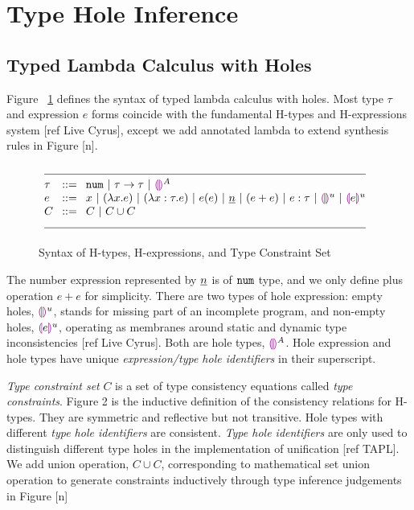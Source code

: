 \section{Type Hole Inference}
\label{sec:typinf}
\subsection{Typed Lambda Calculus with Holes}
\label{sec:syntax}

Figure ~\ref{fig:syntax_fig} defines the syntax of typed lambda calculus with holes. Most type $\tau$ and expression $e$ forms coincide with the fundamental H-types and H-expressions system [ref Live Cyrus], except we add annotated lambda to extend synthesis rules in Figure [n]. 
\begin{figure}[htpb]
$\arraycolsep=4pt\begin{array}{lll}
\multicolumn{3}{l}{\hrulefill} \\
\tau & ::= &
  \tnum ~\vert~
  \tarr{\tau}{\tau} ~\vert~
  \ehole^A
  \\
e & ::= &
  x ~\vert~
  \lamfunc{x}{e} ~\vert~
  \lamfunc{x:\tau}{e} ~\vert~
  e(e) ~\vert~
  \underlinenum{n} ~\vert~
  (e+e) ~\vert~
  e: \tau ~\vert~
  \ehole^u  ~\vert~
  \notehole{e}^u \\
C & :: = &
	C ~\vert~
	C \cup C \\
\multicolumn{3}{l}{\hrulefill} 
\end{array}$
\caption{Syntax of H-types, H-expressions, and Type Constraint Set}
\label{fig:syntax_fig}
\end{figure}

The number expression represented by $\underline{n}$ is of $\mathtt{num}$ type, and we only define plus operation $e + e$ for simplicity. There are two types of hole expression: empty holes, $\textcolor{violet}{\llparenthesis}\textcolor{violet}{\rrparenthesis}^u$, stands for missing part of an incomplete program, and non-empty holes, $\textcolor{violet}{\llparenthesis} e \textcolor{violet}{\rrparenthesis}^u$, operating as membranes around static and dynamic type inconsistencies [ref Live Cyrus]. Both are hole types, $\textcolor{violet}{\llparenthesis}\textcolor{violet}{\rrparenthesis}^A$. Hole expression and hole types have unique \emph{expression/type hole identifiers} in their superscript. 
\par
\emph{Type constraint set} $C$ is a set of type consistency equations called \emph{type constraints}. Figure 2 is the inductive deﬁnition of the consistency relations for H-types. They are symmetric and reflective but not transitive. Hole types with different \emph{type hole identifiers} are consistent. \emph{Type hole identifiers} are only used to distinguish different type holes in the implementation of unification [ref TAPL]. We add union operation, $C \cup C$, corresponding to mathematical set union operation to generate constraints inductively through type inference judgements in Figure [n]

